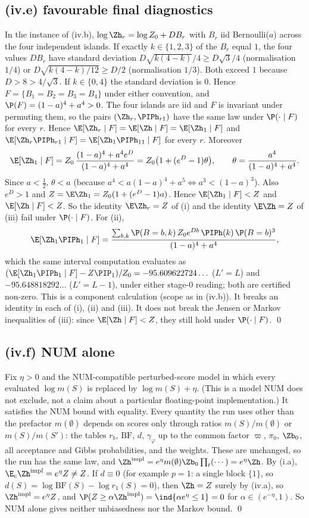 \documentclass[11pt]{report}
\begin{document}
\subsection{(iv.e) favourable final diagnostics}
In the instance of (iv.b), $\log\Zh_r=\log Z_0+DB_r$ with $B_r$ iid Bernoulli($a$) across the four independent islands. If exactly $k\in\{1,2,3\}$ of the $B_r$ equal $1$, the four values $DB_r$ have standard deviation $D\sqrt{k(4-k)}/4\ge D\sqrt3/4$ (normalisation $1/4$) or $D\sqrt{k(4-k)/12}\ge D/2$ (normalisation $1/3$). Both exceed $1$ because $D>8>4/\sqrt3$. If $k\in\{0,4\}$ the standard deviation is $0$. Hence $F=\{B_1=B_2=B_3=B_4\}$ under either convention, and $\P(F)=(1-a)^4+a^4>0$. The four islands are iid and $F$ is invariant under permuting them, so the pairs $(\Zh_r,\PIPh_{r1})$ have the same law under $\P(\cdot\mid F)$ for every $r$. Hence $\E[\Zh_r\mid F]=\E[\Zh\mid F]=\E[\Zh_1\mid F]$ and $\E[\Zh_r\PIPh_{r1}\mid F]=\E[\Zh_1\PIPh_{11}\mid F]$ for every $r$. Moreover
\[ \E[\Zh_1\mid F]=Z_0\,\frac{(1-a)^4+a^4e^D}{(1-a)^4+a^4}=Z_0\big(1+(e^D-1)\theta\big),\qquad \theta=\frac{a^4}{(1-a)^4+a^4}. \]
Since $a<\frac12$, $\theta<a$ (because $a^4<a(1-a)^4+a^5\iff a^3<(1-a)^3$). Also $e^D>1$ and $Z=\E\Zh_1=Z_0(1+(e^D-1)a)$. Hence $\E[\Zh_1\mid F]<Z$ and $\E[\Zh\mid F]<Z$. So the identity $\E\Zh_r=Z$ of (i) and the identity $\E\Zh=Z$ of (iii) fail under $\P(\cdot\mid F)$. For (ii),
\[ \E[\Zh_1\PIPh_1\mid F]=\frac{\sum_{b,k}\P(B=b,k)\,Z_0e^{Db}\,\PIPh(k)\,\P(B=b)^3}{(1-a)^4+a^4}, \]
which the same interval computation evaluates as $(\E[\Zh_1\PIPh_1\mid F]-Z\PIP_1)/Z_0=-95.609622724\ldots$ ($L'=L$) and $-95.648818292\ldots$ ($L'=L-1$), under either stage-0 reading; both are certified non-zero. This is a component calculation (scope as in (iv.b)). It breaks an identity in each of (i), (ii) and (iii). It does not break the Jensen or Markov inequalities of (iii): since $\E[\Zh\mid F]<Z$, they still hold under $\P(\cdot\mid F)$. \qed

\subsection{(iv.f) NUM alone}
Fix $\eta>0$ and the NUM-compatible perturbed-score model in which every evaluated $\log m(S)$ is replaced by $\log m(S)+\eta$. (This is a model NUM does not exclude, not a claim about a particular floating-point implementation.) It satisfies the NUM bound with equality. Every quantity the run uses other than the prefactor $m(\emptyset)$ depends on scores only through ratios $m(S)/m(\emptyset)$ or $m(S)/m(S')$: the tables $r_b$, $\mathrm{BF}$, $d$, $\gamma_\varphi$ up to the common factor $\varpi$, $\pi_0$, $\Zb_0$, all acceptance and Gibbs probabilities, and the weights. These are unchanged, so the run has the same law, and $\Zh^{\rm impl}=e^\eta m(\emptyset)\Zb_0\prod_t(\cdots)=e^\eta\Zh$. By (i.a), $\E_c\Zh^{\rm impl}=e^\eta Z\neq Z$. If $d\equiv0$ (for example $p=1$: a single block $\{1\}$, so $d(S)=\log\mathrm{BF}(S)-\log r_1(S)=0$), then $\Zh=Z$ surely by (iv.a), so $\Zh^{\rm impl}=e^\eta Z$, and $\P(Z\ge\alpha\Zh^{\rm impl})=\ind\{\alpha e^\eta\le1\}=0$ for $\alpha\in(e^{-\eta},1)$. So NUM alone gives neither unbiasedness nor the Markov bound. \qed
\end{document}
